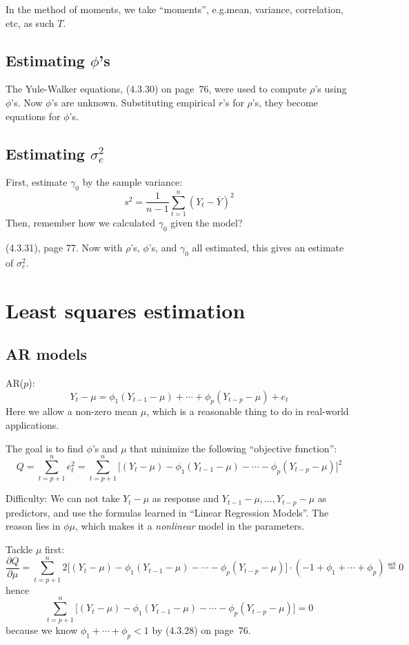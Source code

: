 \documentclass[12pt]{article}
\begin{document}
In the method of moments,
we take ``moments'', e.g.\@ mean, variance, correlation, etc,
as such $T$.

\subsection{Estimating $\phi$'s}

The Yule-Walker equations, (4.3.30) on page~76,
were used to compute $\rho$'s using $\phi$'s.
Now $\phi$'s are unknown.
Substituting empirical $r$'s for $\rho$'s,
they become equations for $\phi$'s.

\subsection{Estimating $\sigma^2_e$}

First, estimate $\gamma_0$ by the sample variance:
\[
s^2 = \frac{1}{n-1} \sum_{t=1}^n (Y_t - \overline{Y})^2
\]
Then, remember how we calculated $\gamma_0$ given the model?

(4.3.31), page 77. Now with $\rho$'s, $\phi$'s, and $\gamma_0$ all
estimated, this gives an estimate of $\sigma_e^2$.



\section{Least squares estimation}

\subsection{AR models}

AR($p$):
\[
Y_t - \mu = \phi_1(Y_{t-1} - \mu) + \dotsb + \phi_p(Y_{t-p} - \mu) + e_t
\]
Here we allow a non-zero mean $\mu$,
which is a reasonable thing to do in real-world applications.

The goal is to find $\phi$'s and $\mu$ that
minimize the following ``objective function'':
\[
Q = \sum_{t=p+1}^n e_t^2
  = \sum_{t=p+1}^n
    \bigl[(Y_t - \mu) - \phi_1(Y_{t-1} - \mu) - \dotsb - \phi_p(Y_{t-p} - \mu)\bigr]^2
\]

Difficulty:
We can not take
    $Y_t - \mu$ as response and 
    $Y_{t-1} - \mu,\dotsc,Y_{t-p} - \mu$ as predictors,
    and use the formulas learned in
    ``Linear Regression Models''.
    The reason lies in $\phi \mu$, which
    makes it a \emph{nonlinear} model in the parameters.

Tackle $\mu$ first:
\[
\frac{\partial Q}{\partial \mu}
=
  \sum_{t=p+1}^n
    2\bigl[(Y_t - \mu) - \phi_1(Y_{t-1} - \mu) - \dotsb - \phi_p(Y_{t-p} - \mu)\bigr]
    \cdot (-1 + \phi_1 +\dotsb+\phi_p)
\overset{\text{set}}{=}
0
\]
hence
\[
\sum_{t=p+1}^n
  \bigl[(Y_t - \mu) - \phi_1(Y_{t-1} - \mu) - \dotsb - \phi_p(Y_{t-p} - \mu)\bigr]
= 0
\]
because we know
$\phi_1 + \dotsb + \phi_p < 1$ by (4.3.28) on page~76.
\end{document}

